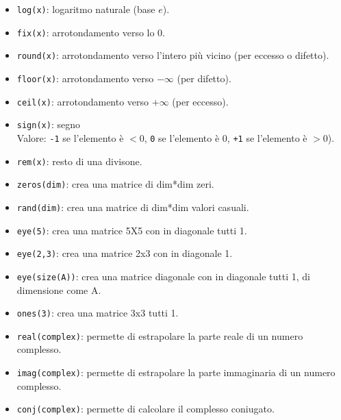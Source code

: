 \begin{itemize}
	\item	\texttt{log(x)}: logaritmo naturale (base $e$).
	
	\item	\texttt{fix(x)}: arrotondamento verso lo 0.
	
	\item	\texttt{round(x)}: arrotondamento verso l'intero più vicino (per eccesso o difetto).
	
	\item	\texttt{floor(x)}: arrotondamento verso $-\infty$ (per difetto).
	
	\item	\texttt{ceil(x)}: arrotondamento verso $+\infty$ (per eccesso).
	
	\item	\texttt{sign(x)}: segno \\ 
	Valore: \texttt{-1} se l'elemento è $< 0$,  \texttt{0} se l'elemento è $0$,  \texttt{+1} se l'elemento è $> 
	0$).
	
	\item	\texttt{rem(x)}: resto di una divisone.

    \item	\texttt{zeros(dim)}: crea una matrice di dim*dim zeri.
    \item	\texttt{rand(dim)}: crea una matrice di dim*dim valori casuali. 
    \item	\texttt{eye(5)}: crea una matrice 5X5 con in diagonale tutti 1.
    \item	\texttt{eye(2,3)}: crea una matrice 2x3 con in diagonale 1.
    \item	\texttt{eye(size(A))}: crea una matrice diagonale con in diagonale tutti 1, di dimensione come A.
    \item	\texttt{ones(3)}: crea una matrice 3x3 tutti 1.

    \item	\texttt{real(complex)}: permette di estrapolare la parte reale di un numero complesso.
    \item	\texttt{imag(complex)}: permette di estrapolare la parte immaginaria di un numero complesso.
    \item	\texttt{conj(complex)}: permette di calcolare il complesso coniugato.
   

\end{itemize}